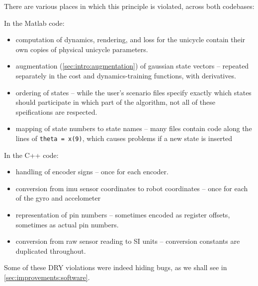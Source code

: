 \documentclass[main.tex]{subfiles}
\begin{document}
	There are various places in which this principle is violated, across both codebases:
	\begin{multicols}{2}
		\raggedcolumns
		In the Matlab code:

		\begin{itemize}[noitemsep]
			\item computation of dynamics, rendering, and loss for the unicycle contain their own copies of physical unicycle parameters.
			\item augmentation (\ref{sec:intro:augmentation}) of gaussian state vectors -- repeated separately in the cost and dynamics-training functions, with derivatives.
			\item ordering of states -- while the user's scenario files specify exactly which states should participate in which part of the algorithm, not all of these speifications are respected.
			\item mapping of state numbers to state names -- many files contain code along the lines of \lstinline{theta = x(9)}, which causes problems if a new state is inserted
		\end{itemize}

		\columnbreak

		In the C++ code:

		\begin{itemize}[noitemsep]
			\item handling of encoder signs -- once for each encoder.
			\item conversion from imu sensor coordinates to robot coordinates -- once for each of the gyro and accelometer
			\item representation of pin numbers -- sometimes encoded as register offsets, sometimes as actual pin numbers.
			\item conversion from raw sensor reading to SI units -- conversion constants are duplicated throughout.
		\end{itemize}
	\end{multicols}
	Some of these DRY violations were indeed hiding bugs, as we shall see in \cref{sec:improvements:software}.
\end{document}
